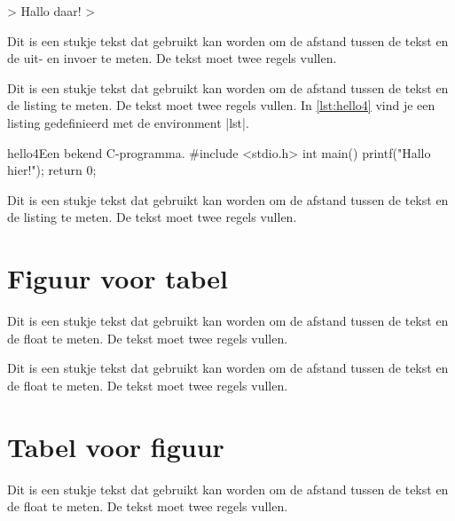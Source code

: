 \begin{llstShortInline}
\begin{coutput}
> 
Hallo daar!
>
\end{coutput}

Dit is een stukje tekst dat gebruikt kan worden om de afstand tussen de tekst en de uit- en invoer te meten. De tekst moet twee regels vullen.

\clearpage
Dit is een stukje tekst dat gebruikt kan worden om de afstand tussen de tekst en de listing te meten. De tekst moet twee regels vullen. In \cref{lst:hello4} vind je een listing gedefinieerd met de environment |lst|.

\begin{lst}[style=cstyle]{hello4}{Een bekend C-programma.}
#include <stdio.h>
int main()
{
	printf("Hallo hier!\n");
	return 0;
}
\end{lst}

Dit is een stukje tekst dat gebruikt kan worden om de afstand tussen de tekst en de listing te meten. 
De tekst moet twee regels vullen. 

\clearpage
\section{Figuur voor tabel}
Dit is een stukje tekst dat gebruikt kan worden om de afstand tussen de tekst en de float te meten. De tekst moet twee regels vullen.



Dit is een stukje tekst dat gebruikt kan worden om de afstand tussen de tekst en de float te meten. De tekst moet twee regels vullen.

\clearpage
\section{Tabel voor figuur}
Dit is een stukje tekst dat gebruikt kan worden om de afstand tussen de tekst en de float te meten. De tekst moet twee regels vullen.


\end{llstShortInline}
